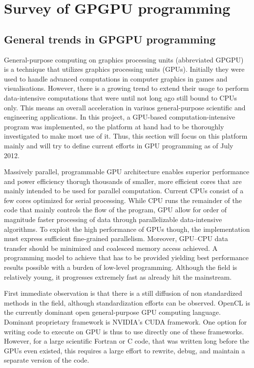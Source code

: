 \chapter{Survey of GPGPU programming}
\section{General trends in GPGPU programming}
General-purpose computing on graphics processing units (abbreviated GPGPU) is a technique that utilizes graphics processing units (GPUs). Initially they were used to handle advanced computations in computer graphics in games and visualisations. However, there is a growing trend to extend their usage to perform data-intensive computations that were until not long ago still bound to CPUs only. This means an overall acceleration in variuos general-purpose scientific and engineering applications. In this project, a GPU-based computation-intensive program was implemented, so the platform at hand had to be thoroughly investigated to make most use of it. Thus, this section will focus on this platform mainly and will try to define current efforts in GPU programming as of July 2012.

Massively parallel, programmable GPU architecture enables superior performance and power efficiency thorugh thousands of smaller, more efficient cores that are mainly intended to be used for parallel computation. Current CPUs consist of a few cores optimized for serial processing. While CPU runs the remainder of the code that mainly controls the flow of the program, GPU allow for order of magnitude faster processing of data through parallelizable data-intensive algorithms. To exploit the high performance of GPUs though, the implementation must express sufficient fine-grained parallelism. Moreover, GPU–CPU data transfer should be minimized and coalesced memory access achieved. A programming model to achieve that has to be provided yielding best performance results possible with a burden of low-level programming. Although the field is relatively young, it progresses extremely fast as already hit the mainstream.

First immediate observation is that there is a still diffusion of non standardized methods in the field, although standardization efforts can be observed. OpenCL is the currently dominant open general-purpose GPU computing language. Dominant proprietary framework is NVIDIA's CUDA framework. One option for writing code to execute on GPU is thus to use directly one of these frameworks. However, for a large scientific Fortran or C code, that was written long before the GPUs even existed, this requires a large effort to rewrite, debug, and maintain a separate version of the code.

